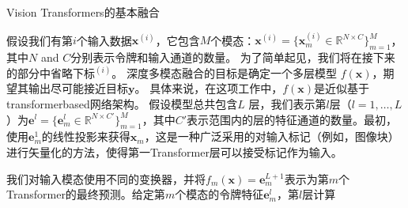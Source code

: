 Vision Transformers的基本融合

假设我们有第$i$个输入数据$\bm{x}^{(i)}$，它包含$M$个模态：$\bm{x}^{(i)}=\{\bm{x}_m^{(i)}\in\mathbb{R}^{N\times C}\}_{m=1}^M$，其中$N$ and $C$分别表示令牌和输入通道的数量。
为了简单起见，我们将在接下来的部分中省略下标$^{(i)}$。
深度多模态融合的目标是确定一个多层模型 $f(\bm{x})$，期望其输出尽可能接近目标$\bm{y}$。
具体来说，在这项工作中，$f(\bm{x})$是近似基于transformerbased网络架构。
假设模型总共包含$L$ 层，我们表示第$l$层（$l=1,\ldots,L$）为$\bm{e}^l=\{\bm{e}^l_m\in\mathbb{R}^{N\times C'}\}_{m=1}^M$，其中$C'$表示范围内的层的特征通道的数量。最初，使用$\bm{e}_m^1$的线性投影来获得$\bm{x}_m$，这是一种广泛采用的对输入标记（例如，图像块）进行矢量化的方法，使得第一Transformer层可以接受标记作为输入。





我们对输入模态使用不同的变换器，并将$f_m(\bm{x})=\bm{e}_m^{L+1}$表示为第$m$个Transformer的最终预测。给定第$m$个模态的令牌特征$\bm{e}_m^{l}$，第$l$层计算


















